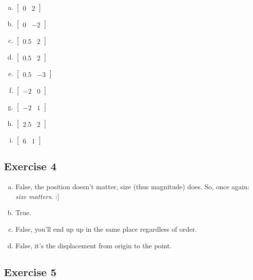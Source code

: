\documentclass[11pt]{article}
\begin{document}
\begin{enumerate}[a.]
	\item %
$
\begin{bmatrix}
0 & 2
\end{bmatrix}
$
	\item %
$
\begin{bmatrix}
0 & -2
\end{bmatrix}
$
	\item %
$
\begin{bmatrix}
0.5 & 2
\end{bmatrix}
$
	\item %
$
\begin{bmatrix}
0.5 & 2
\end{bmatrix}
$
	\item %
$
\begin{bmatrix}
0.5 & -3
\end{bmatrix}
$
	\item %
$
\begin{bmatrix}
-2 & 0
\end{bmatrix}
$
	\item %
$
\begin{bmatrix}
-2 & 1
\end{bmatrix}
$
	\item %
$
\begin{bmatrix}
2.5 & 2
\end{bmatrix}
$
	\item %
$
\begin{bmatrix}
6 & 1
\end{bmatrix}
$
\end{enumerate}

\subsection{Exercise 4}

\begin{enumerate}[a.]
	\item False, the position doesn't matter, size (thus magnitude) does. So, once again: \textit{size matters}. :]
	\item True.
	\item False, you'll end up up in the same place regardless of order.
	\item False, it's the displacement from origin to the point.
\end{enumerate}

\subsection{Exercise 5}
\end{document}
